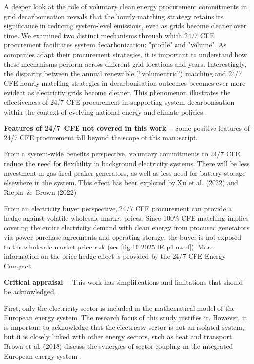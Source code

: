 A deeper look at the role of voluntary clean energy procurement commitments in grid decarbonisation reveals that the hourly matching strategy retains its significance in reducing system-level emissions, even as grids become cleaner over time.
We examined two distinct mechanisms through which 24/7 CFE procurement facilitates system decarbonization: "profile" and "volume".
As companies adapt their procurement strategies, it is important to understand how these mechanisms perform across different grid locations and years.
Interestingly, the disparity between the annual renewable (\enquote{volumentric}) matching and 24/7 CFE hourly matching strategies in decarbonisation outcomes becomes ever more evident as electricity grids become cleaner.
This phenomenon illustrates the effectiveness of 24/7 CFE procurement in supporting system decarbonisation within the context of evolving national energy and climate policies.


\textbf{Features of 24/7~CFE not covered in this work --} Some positive features of 24/7 CFE procurement fall beyond the scope of this manuscript.

From a system-wide benefits perspective, voluntary commitments to 24/7 CFE reduce the need for flexibility in background electricity systems. 
There will be less investment in gas-fired peaker generators, as well as less need for battery storage elsewhere in the system.
This effect has been explored by Xu et al. (2022) and Riepin~\&~Brown (2022) \cite{riepin-zenodo-systemlevel247,xu-247CFE-report}

From an electricity buyer perspective, 24/7 CFE procurement can provide a hedge against volatile wholesale market prices.
Since 100\% CFE matching implies covering the entire electricity demand with clean energy from procured generators via power purchase agreements and operating storage, the buyer is not exposed to the wholesale market price risk (see \cref{fig:10-2025-IE-p1-used}).
More information on the price hedge effect is provided by the 24/7 CFE Energy Compact \cite{gocarbonfree247}.


\textbf{Critical appraisal --} This work has simplifications and limitations that should be acknowledged.

First, only the electricity sector is included in the mathematical model of the European energy system.
The research focus of this study justifies it.
However, it is important to acknowledge that the electricity sector is not an isolated system, but it is closely linked with other energy sectors, such as heat and transport.
Brown et al. (2018) discuss the synergies of sector coupling in the integrated European energy system \cite{brownSynergiesSectorCoupling2018}.

